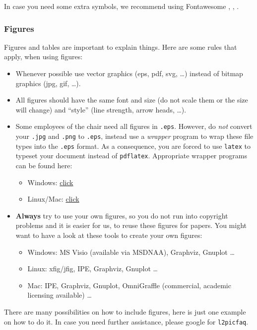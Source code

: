 In case you need some extra symbols, we recommend using Fontawesome \faChrome{}, \faFirefox{}, \faSafari{}.

\subsubsection{Figures}

Figures and tables are important to explain things. Here are some rules that apply, when using figures:

\begin{itemize}
\item Whenever possible use vector graphics (eps, pdf, svg, \ldots) instead of bitmap graphics (jpg, gif, \ldots).
\item All figures should have the same font and size (do not scale them or the size will change) and ``style'' (line strength, arrow heads, \ldots).
\item Some employees of the chair need all figures in \texttt{.eps}. However, do \emph{not} convert your \texttt{.jpg} and \texttt{.png} to \texttt{.eps}, instead use a \emph{wrapper} program to wrap these file types into the \texttt{.eps} format. As a consequence, you are forced to use \texttt{latex} to typeset your document instead of \texttt{pdflatex}. Appropriate wrapper programs can be found here:
\begin{itemize}
\item Windows: \href{https://wiki.crypto.rub.de/WikiCosy/img_auth.php/6/60/JPG-PNGtoEPS.rar}{click}
\item Linux/Mac: \href{http://imgtops.sourceforge.net/}{click}
\end{itemize}
\item \textbf{Always} try to use your own figures, so you do not run into copyright problems and it is easier for us, to reuse these figures for papers. You might want to have a look at these tools to create your own figures:
	\begin{itemize}
	\item Windows: MS Visio (available via MSDNAA), Graphviz, Gnuplot \dots
	\item Linux: xfig/jfig, IPE, Graphviz, Gnuplot \dots
	\item Mac: IPE, Graphviz, Gnuplot, OmniGraffle (commercial, academic licensing available) \dots
	\end{itemize}
\end{itemize}

There are many possibilities on how to include figures, here is just one example on how to do it. In case you need further assistance, please google for \texttt{l2picfaq}.


